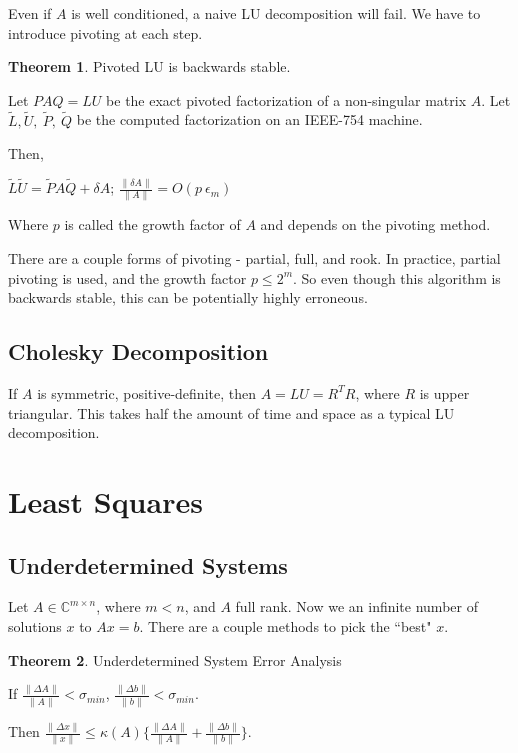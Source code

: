 \documentclass{article}
\theoremstyle{definition}
\newtheorem{theorem}{Theorem}
\begin{document}
Even if $A$ is well conditioned, a naive LU decomposition will fail. We have to introduce pivoting at each step. \newline

\begin{theorem} Pivoted LU is backwards stable.

Let $PAQ = LU$ be the exact pivoted factorization of a non-singular matrix $A$. Let $\tilde{L},\tilde{U},\ \tilde{P},\ \tilde{Q}$ be the computed factorization on an IEEE-754 machine. 

Then,

$\tilde{L}\tilde{U} = \tilde{P}A\tilde{Q} + \delta A$; $\frac{\|\delta A\|}{\|A\|} = O(p\ \epsilon_m)$

Where $p$ is called the growth factor of $A$ and depends on the pivoting method.

\end{theorem}

\vspace{3ex}
There are a couple forms of pivoting - partial, full, and rook. In practice, partial pivoting is used, and the growth factor $p \leq 2^m$. So even though this algorithm is backwards stable, this can be potentially highly erroneous.

\subsection{Cholesky Decomposition}

If $A$ is symmetric, positive-definite, then $A = LU = R^T R$, where $R$ is upper triangular. This takes half the amount of time and space as a typical LU decomposition.

\pagebreak

\section{Least Squares}

\subsection{Underdetermined Systems}

Let $A \in \mathbb{C}^{m \times n}$, where $m < n$, and $A$ full rank. Now we an infinite number of solutions $x$ to $Ax = b$. There are a couple methods to pick the ``best" $x$. \newline

\begin{theorem} Underdetermined System Error Analysis

    If $\frac{\|\Delta A\|}{\|A\|} < \sigma_{min}$, $\frac{\|\Delta b\|}{\|b\|} < \sigma_{min}$.
    
    Then $\frac{\|\Delta x\|}{\|x\|} \leq \kappa(A) \big\{ \frac{\|\Delta A\|}{\|A\|} + \frac{\|\Delta b\|}{\|b\|} \big\}$.
\end{theorem}
\end{document}
